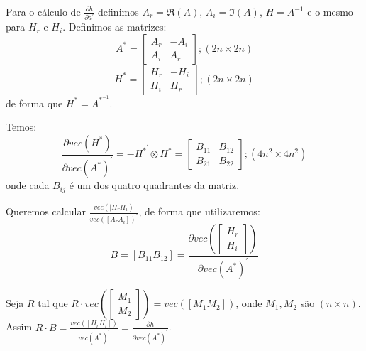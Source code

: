 \documentclass[a4paper,10pt]{article}
\begin{document}
Para o cálculo de $\frac{\partial h}{\partial a^{'}}$ definimos $A_{r} = \Re(A)$, $A_{i} = \Im(A)$, $H = A^{-1}$ e o mesmo para $H_{r}$ e $H_{i}$. Definimos as matrizes:
\begin{equation}
A^{\ast} = \left[ \begin{array}{cc} A_{r} & -A_{i} \\ A_{i} & A_{r} \end{array} \right]; (2n \times 2n)
\end{equation}
\begin{equation}
H^{\ast} = \left[ \begin{array}{cc} H_{r} & -H_{i} \\ H_{i} & H_{r} \end{array} \right]; (2n \times 2n)
\end{equation}
de forma que $H^{\ast} = A^{\ast^{-1}}$.

Temos:
\begin{equation}
\frac{\partial vec(H^{\ast})}{\partial vec(A^{\ast})^{'}} = -H^{\ast^{'}} \otimes H^{\ast} = \left[ \begin{array}{cc} B_{11} & B_{12} \\ B_{21} & B_{22}
\end{array} \right]; (4n^{2} \times 4n^{2})
\end{equation}
onde cada $B_{ij}$ é um dos quatro quadrantes da matriz.

Queremos calcular $\frac{vec([H_{r} H_{i})}{vec([A_{r} A_{i}])^{'}}$, de forma que utilizaremos:
\begin{equation}
B = [B_{11} B_{12}] = \frac{\partial vec( \left[ \begin{array}{c} H_{r} \\ H_{i} \end{array} \right])}{\partial vec(A^{\ast})^{'}}
\end{equation}

Seja $R$ tal que $R \cdot vec(\left[ \begin{array}{c} M_{1} \\ M_{2} \end{array} \right]) = vec([M_{1} M_{2}])$, onde $M_{1}, M_{2}$ são $(n \times n)$. Assim $R \cdot B = \frac{vec([H_{r} H_{i}])}{vec(A^{\ast})^{'}} = \frac{\partial h}{\partial vec(A^{\ast})^{'}}$.
\end{document}
